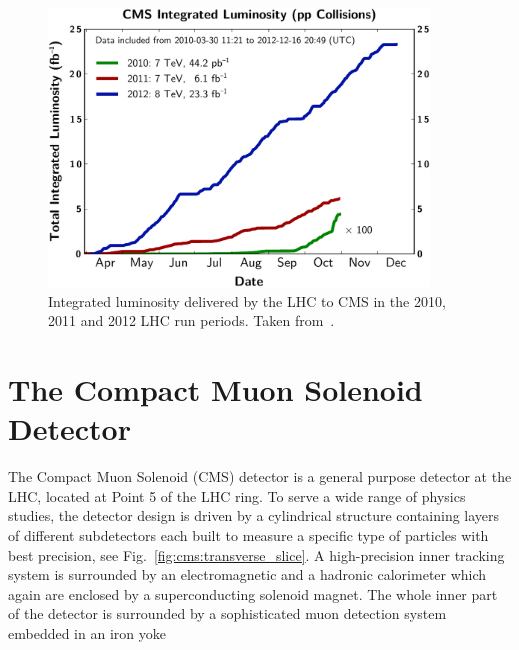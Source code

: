\begin{figure}[htp]
    \centering
    \includegraphics[width=0.9\textwidth]{figures/cms_detector/lumi_integrated.pdf}
    \caption[Integrated luminosity delivered to CMS]{Integrated luminosity
        delivered by the LHC to CMS in the 2010, 2011 and 2012 LHC run periods.
        Taken from~\cite{Berger:2014aca}.}
    \label{fig:cms:lumi_integrated}
\end{figure}


\section{The Compact Muon Solenoid Detector}

The Compact Muon Solenoid (CMS) detector is a general purpose detector at the
LHC, located at Point 5 of the LHC ring. To serve a wide range of physics
studies, the detector design is driven by a cylindrical structure containing
layers of different subdetectors each built to measure a specific type of
particles with best precision, see Fig.~\ref{fig:cms:transverse_slice}. A
high-precision inner tracking system is surrounded by an electromagnetic and a
hadronic calorimeter which again are enclosed by a superconducting solenoid
magnet. The whole inner part of the detector is surrounded by a sophisticated
muon detection system embedded in an iron yoke

